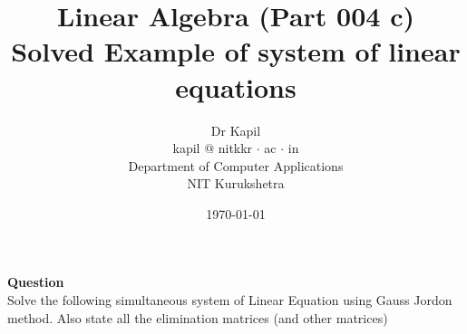 \documentclass[11pt,a4paper]{article}
\begin{document}
\title{Linear Algebra (Part 004 c)\\Solved Example of system of linear equations}
\author{Dr Kapil\\kapil $@$ nitkkr $\cdot$ ac $\cdot$ in\\Department of Computer Applications\\ NIT Kurukshetra}
\date{\today}
\maketitle
\thispagestyle{fancy}   

\textbf{Question}\\ 
Solve the following simultaneous system of Linear Equation using Gauss Jordon method. Also state all the elimination matrices (and other matrices)\\
\end{document}
